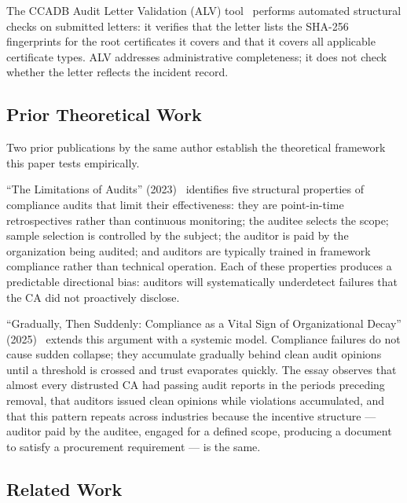 \documentclass[10pt,twocolumn,letterpaper]{article}
\begin{document}
The CCADB Audit Letter Validation (ALV) tool~\cite{ccadb-alv} performs
automated structural checks on submitted letters: it verifies that the
letter lists the SHA-256 fingerprints for the root certificates it covers
and that it covers all applicable certificate types. ALV addresses
administrative completeness; it does not check whether the letter reflects
the incident record.

\subsection{Prior Theoretical Work}

Two prior publications by the same author establish the theoretical
framework this paper tests empirically.

``The Limitations of Audits'' (2023)~\cite{hurst2023} identifies five
structural properties of compliance audits that limit their effectiveness:
they are point-in-time retrospectives rather than continuous monitoring;
the auditee selects the scope; sample selection is controlled by the
subject; the auditor is paid by the organization being audited; and
auditors are typically trained in framework compliance rather than
technical operation. Each of these properties produces a predictable
directional bias: auditors will systematically underdetect failures that
the CA did not proactively disclose.

``Gradually, Then Suddenly: Compliance as a Vital Sign of Organizational
Decay'' (2025)~\cite{hurst2025} extends this argument with a systemic
model. Compliance failures do not cause sudden collapse; they accumulate
gradually behind clean audit opinions until a threshold is crossed and
trust evaporates quickly. The essay observes that almost every distrusted CA
had passing audit reports in the periods preceding removal, that auditors issued clean opinions while
violations accumulated, and that this pattern repeats across industries
because the incentive structure --- auditor paid by the auditee,
engaged for a defined scope, producing a document to satisfy a
procurement requirement --- is the same.

\subsection{Related Work}
\label{sec:related}
\end{document}
